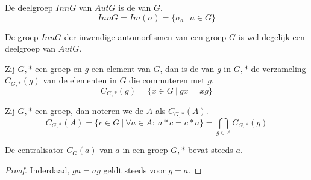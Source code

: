 \documentclass[main.tex]{subfiles}
\begin{document}
\begin{de}
  \label{de:inn-g}
  De deelgroep $InnG$ van $AutG$ is de  van $G$.
  \[ InnG = Im(\sigma) = \{ \sigma_{a}\ |\ a \in G \} \]
\end{de}

\begin{st}
  De groep $InnG$ der inwendige automorfismen van een groep $G$ is wel degelijk een deelgroep van $AutG$.
\end{st}

\begin{de}
  Zij $G,*$ een groep en $g$ een element van $G$, dan is de  van $g$ in $G,*$ de verzameling $C_{G,*}(g)$ van de elementen in $G$ die commuteren met $g$.
  \[ C_{G,*}(g) = \{ x \in G\ |\ gx = xg \} \]
\end{de}

\begin{de}
  Zij $G,*$ een groep, dan noteren we de  $A$ als $C_{G,*}(A)$.
  \[ C_{G,*}(A) = \{ c\in G \ |\ \forall a\in A:\ a*c = c*a \} = \bigcap_{g\in A}C_{G,*}(g) \]
\end{de}

\begin{ei}
  \label{ei:centralisator-bevat-element}
  De centralisator $C_{G}(a)$ van $a$ in een groep $G,*$ bevat steeds $a$.
  
  \begin{proof}
    Inderdaad, $ga = ag$ geldt steeds voor $g=a$.
  \end{proof}
\end{ei}
\end{document}
